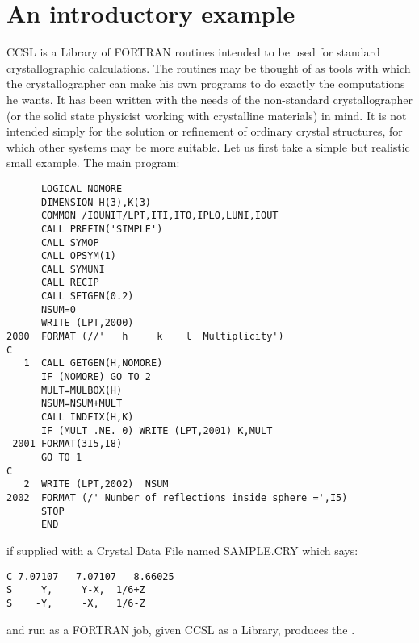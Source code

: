 \section{An introductory example}
CCSL is a Library of FORTRAN routines intended to be used for standard
crystallographic calculations.  The routines may be thought of as
tools with which the crystallographer can make his own programs to do
exactly the computations he wants.
\pn
It has been written with the needs of the non-standard crystallographer
(or the solid state physicist working with crystalline materials) in mind.
It is not intended simply for the solution or refinement of ordinary crystal
structures, for which other systems may be more suitable.
\pn
Let us first take a simple but realistic small example.  The main program:
\bgs
%
\ttfamily\begin{verbatim}
      LOGICAL NOMORE
      DIMENSION H(3),K(3)
      COMMON /IOUNIT/LPT,ITI,ITO,IPLO,LUNI,IOUT
      CALL PREFIN('SIMPLE')
      CALL SYMOP
      CALL OPSYM(1)
      CALL SYMUNI
      CALL RECIP
      CALL SETGEN(0.2)
      NSUM=0
      WRITE (LPT,2000)
2000  FORMAT (//'   h     k    l  Multiplicity')
C
   1  CALL GETGEN(H,NOMORE)
      IF (NOMORE) GO TO 2
      MULT=MULBOX(H)
      NSUM=NSUM+MULT
      CALL INDFIX(H,K)
      IF (MULT .NE. 0) WRITE (LPT,2001) K,MULT
 2001 FORMAT(3I5,I8)
      GO TO 1
C
   2  WRITE (LPT,2002)  NSUM
2002  FORMAT (/' Number of reflections inside sphere =',I5)
      STOP
      END
\end{verbatim}\rm 
\bgs 
if supplied with a Crystal Data File named SAMPLE.CRY which says:\\
\ttfamily\begin{verbatim}
C 7.07107   7.07107   8.66025
S     Y,     Y-X,  1/6+Z
S    -Y,     -X,   1/6-Z
\end{verbatim}\rm 
\bgs
\par 
and run as a FORTRAN job, given CCSL as a Library, produces the 
.
\p
